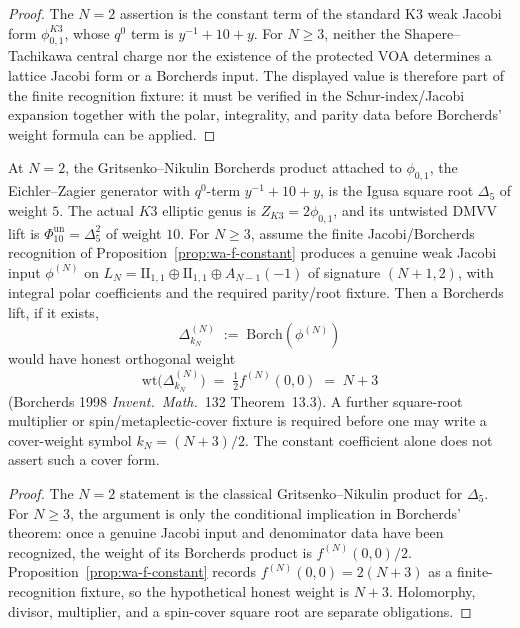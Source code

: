 \begin{proof}
The $N=2$ assertion is the constant term of the standard K3 weak Jacobi
form $\phi_{0,1}^{K3}$, whose $q^0$ term is
$y^{-1}+10+y$. For $N\ge 3$, neither the Shapere--Tachikawa central
charge nor the existence of the protected VOA determines a lattice
Jacobi form or a Borcherds input. The displayed value is therefore part
of the finite recognition fixture: it must be verified in the
Schur-index/Jacobi expansion together with the polar, integrality, and
parity data before Borcherds' weight formula can be applied.
\end{proof}

\begin{theorem}[$N=2$ Borcherds lift and conditional $N\ge 3$ weight;
 \ClaimStatusConditional]
\label{thm:wa-siegel-weight-kN}
At $N=2$, the Gritsenko--Nikulin Borcherds product attached to
\(\phi_{0,1}\), the Eichler--Zagier generator with \(q^0\)-term
\(y^{-1}+10+y\), is the Igusa square root \(\Delta_5\) of weight \(5\).
The actual \(K3\) elliptic genus is \(Z_{K3}=2\phi_{0,1}\), and its
untwisted DMVV lift is \(\Phi_{10}^{\mathrm{un}}=\Delta_5^2\) of weight
\(10\). For \(N\ge 3\), assume the finite
Jacobi/Borcherds recognition of Proposition~\ref{prop:wa-f-constant}
produces a genuine weak Jacobi input $\phi^{(N)}$ on
$L_N=\mathrm{II}_{1,1}\oplus \mathrm{II}_{1,1}\oplus A_{N-1}(-1)$ of
signature $(N+1,2)$, with integral polar coefficients and the required
parity/root fixture. Then a Borcherds lift, if it exists,
\[
 \Delta_{k_N}^{(N)} \;:=\; \mathrm{Borch}(\phi^{(N)})
\]
would have honest orthogonal weight
\[
 \mathrm{wt}\bigl(\Delta_{k_N}^{(N)}\bigr)
 \;=\; \tfrac{1}{2} f^{(N)}(0, 0)
 \;=\; N + 3
\]
(Borcherds 1998 \emph{Invent.~Math.}~132 Theorem~13.3). A further
square-root multiplier or spin/metaplectic-cover fixture is required
before one may write a cover-weight symbol
$k_N=(N+3)/2$. The constant coefficient alone does not assert such a
cover form.
\end{theorem}

\begin{proof}
The $N=2$ statement is the classical Gritsenko--Nikulin product for
$\Delta_5$. For $N\ge 3$, the argument is only the conditional
implication in Borcherds' theorem: once a genuine Jacobi input and
denominator data have been recognized, the weight of its Borcherds
product is $f^{(N)}(0,0)/2$. Proposition~\ref{prop:wa-f-constant}
records $f^{(N)}(0,0)=2(N+3)$ as a finite-recognition fixture, so the
hypothetical honest weight is $N+3$. Holomorphy, divisor, multiplier,
and a spin-cover square root are separate obligations.
\end{proof}

